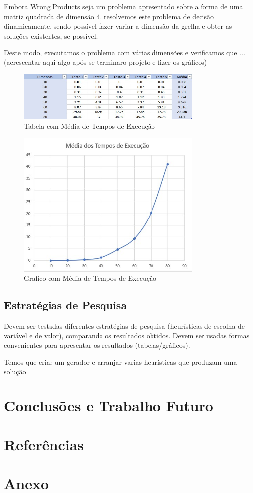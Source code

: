 \documentclass[11pt]{article}
\begin{document}
Embora Wrong Products seja um problema apresentado sobre a forma de uma matriz quadrada de dimensão 4, resolvemos este problema de decisão dinamicamente, sendo possível fazer variar a dimensão da grelha e obter as soluções existentes, se possível.

Deste modo, executamos o problema com várias dimensões e verificamos que ...(acrescentar aqui algo após se terminaro projeto e fizer os gráficos)

\begin{figure}[h!]
	\begin{center}
		\includegraphics[width=0.8\textwidth]{tabela-normal.jpg}
		\caption{Tabela com Média de Tempos de Execução}
	\end{center}
\end{figure}

\begin{figure}[h!]
	\begin{center}
		\includegraphics[width=0.8\textwidth]{grafico-normal.jpg}
		\caption{Grafico com Média de Tempos de Execução}
	\end{center}
\end{figure}

\subsection{Estratégias de Pesquisa} Devem ser testadas diferentes estratégias de pesquisa
(heurísticas de escolha de variável e de valor), comparando os resultados obtidos.
Devem ser usadas formas convenientes para apresentar os resultados (tabelas/gráficos).

Temos que criar um gerador e arranjar varias heurísticas que produzam uma solução

\section{Conclusões e Trabalho Futuro} 


\section{Referências} 



\section{Anexo} 
\end{document}
